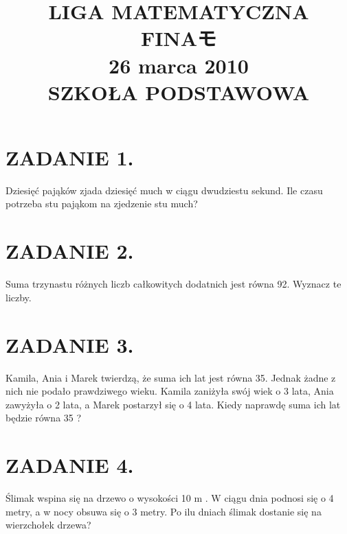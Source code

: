 \documentclass[10pt]{article}
\title{LIGA MATEMATYCZNA \\
 FINAモ \\
 26 marca 2010 \\
 SZKOŁA PODSTAWOWA }
\author{}
\date{}
\begin{document}
\maketitle
\section*{ZADANIE 1.}
Dziesięć pająków zjada dziesięć much w ciągu dwudziestu sekund. Ile czasu potrzeba stu pająkom na zjedzenie stu much?

\section*{ZADANIE 2.}
Suma trzynastu różnych liczb całkowitych dodatnich jest równa 92. Wyznacz te liczby.

\section*{ZADANIE 3.}
Kamila, Ania i Marek twierdzą, że suma ich lat jest równa 35. Jednak żadne z nich nie podało prawdziwego wieku. Kamila zaniżyła swój wiek o 3 lata, Ania zawyżyła o 2 lata, a Marek postarzył się o 4 lata. Kiedy naprawdę suma ich lat będzie równa 35 ?

\section*{ZADANIE 4.}
Ślimak wspina się na drzewo o wysokości 10 m . W ciągu dnia podnosi się o 4 metry, a w nocy obsuwa się o 3 metry. Po ilu dniach ślimak dostanie się na wierzchołek drzewa?
\end{document}

